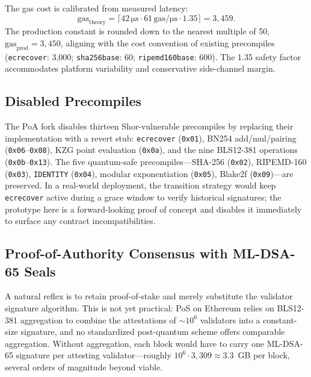 \documentclass[journal,onecolumn,11pt]{IEEEtran}
\begin{document}
The gas cost is calibrated from measured latency:
\begin{equation}
\text{gas}_{\text{theory}} = \lceil 42 \,\mathrm{\mu s} \cdot 61 \,\text{gas}/\mathrm{\mu s} \cdot 1.35 \rceil = 3{,}459.
\label{eq:gas_calib}
\end{equation}
The production constant is rounded down to the nearest multiple of 50, $\text{gas}_{\text{prod}} = 3{,}450$, aligning with the cost convention of existing precompiles (\texttt{ecrecover}: 3{,}000; \texttt{sha256base}: 60; \texttt{ripemd160base}: 600). The 1.35 safety factor accommodates platform variability and conservative side-channel margin.

\subsection{Disabled Precompiles}
\label{sec:design_disabled}

The PoA fork disables thirteen Shor-vulnerable precompiles by replacing their implementation with a revert stub: \texttt{ecrecover} (\texttt{0x01}), BN254 add/mul/pairing (\texttt{0x06}--\texttt{0x08}), KZG point evaluation (\texttt{0x0a}), and the nine BLS12-381 operations (\texttt{0x0b}--\texttt{0x13}). The five quantum-safe precompiles---SHA-256 (\texttt{0x02}), RIPEMD-160 (\texttt{0x03}), \texttt{IDENTITY} (\texttt{0x04}), modular exponentiation (\texttt{0x05}), Blake2f (\texttt{0x09})---are preserved. In a real-world deployment, the transition strategy would keep \texttt{ecrecover} active during a grace window to verify historical signatures; the prototype here is a forward-looking proof of concept and disables it immediately to surface any contract incompatibilities.

\subsection{Proof-of-Authority Consensus with ML-DSA-65 Seals}
\label{sec:design_consensus}

A natural reflex is to retain proof-of-stake and merely substitute the validator signature algorithm. This is not yet practical: PoS on Ethereum relies on BLS12-381 aggregation to combine the attestations of $\sim$$10^6$ validators into a constant-size signature, and no standardized post-quantum scheme offers comparable aggregation. Without aggregation, each block would have to carry one ML-DSA-65 signature per attesting validator---roughly $10^6 \cdot 3{,}309 \approx 3.3$~GB per block, several orders of magnitude beyond viable.
\end{document}
